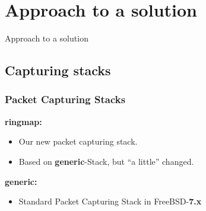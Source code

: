 \documentclass{beamer}
\begin{document}
\begin{frame}
\begin{columns}
\begin{figure}
\end{figure}
\end{columns}
\end{frame}



\section{Approach to a solution}

\begin{frame}
	\begin{center}
	\huge{Approach to a solution}
	\end{center}
\end{frame}


\subsection*{Capturing stacks}
\begin{frame}
\frametitle{Packet Capturing Stacks}
\textbf{ringmap:}
\begin{itemize}
	\item Our new packet capturing stack.
	\item Based on \textbf{generic}-Stack, but "`a little"' changed.\newline
\end{itemize}
\textbf{generic:}
\begin{itemize}
	\item Standard Packet Capturing Stack in FreeBSD-\textbf{7.x}\newline \newline
\end{itemize}
\begin{center}
\end{center}
\end{frame}
\end{document}
